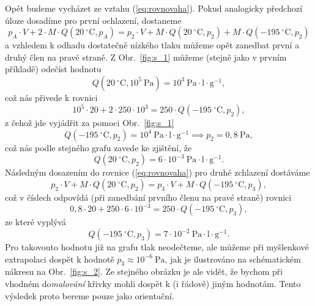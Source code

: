 \documentclass[english]{article}
\newcommand{\unit}[1]{~\mathrm{#1}}
\begin{document}
\vspace{0.5cm}
Opět budeme vycházet ze vztahu (\ref{eq:rovnovaha}). Pokud analogicky předchozí úloze dosadíme pro první ochlazení, dostaneme
\begin{equation}
p_A\cdot V + 2\cdot M\cdot Q(20\unit{^\circ C}, p_A) = p_2\cdot V + M\cdot  Q(20\unit{^\circ C}, p_2) + M\cdot  Q(-195\unit{^\circ C}, p_2)
\label{eq:pr2a}
\end{equation}
a vzhledem k odhadu dostatečně nízkého tlaku můžeme opět zanedbat první a druhý člen na pravé straně. Z Obr.~\ref{fig:s_1} můžeme (stejně jako v prvním příkladě) odečíst hodnotu
\begin{equation}
	Q(20\unit{^\circ C}, 10^{5}\unit{Pa}) = 10^{3}\unit{Pa\cdot l\cdot g^{-1}},
\end{equation}
což nás přivede k rovnici
\begin{equation}
	10^5\cdot 20 + 2\cdot 250\cdot 10^3 = 250\cdot Q(-195\unit{^\circ C}, p_2),
\end{equation}
z čehož jde vyjádřit za pomoci Obr.~\ref{fig:s_1}
\begin{equation}
	Q(-195\unit{^\circ C}, p_2) = 10^4\unit{Pa\cdot l\cdot g^{-1}} \implies p_2 = 0,8\unit{Pa},
\end{equation}
což nás podle stejného grafu zavede ke zjištění, že
\begin{equation}
	 Q(20\unit{^\circ C}, p_2) = 6\cdot 10^{-3}\unit{Pa\cdot l\cdot g^{-1}}.
\end{equation}
Následným dosazením do rovnice (\ref{eq:rovnovaha}) pro druhé zchlazení dostáváme
\begin{equation}
	p_2\cdot V+M\cdot Q(20\unit{^\circ C}, p_2) = p_3\cdot V+M\cdot Q(-195\unit{^\circ C}, p_3),
\end{equation}
což v číslech odpovídá (při zanedbání prvního členu na pravé straně) rovnici
\begin{equation}
	0,8\cdot 20+250\cdot 6\cdot 10^{-3} = 250\cdot Q(-195\unit{^\circ C}, p_3),
\end{equation}
ze které vyplývá
\begin{equation}
	Q(-195\unit{^\circ C}, p_3) = 7\cdot 10^{-2} \unit{Pa\cdot l\cdot g^{-1}}.
\end{equation}
Pro takovouto hodnotu již na grafu tlak neodečteme, ale můžeme při myšlenkové extrapolaci dospět k hodnotě $p_3\approx 10^{-6}\unit{Pa}$, jak je ilustrováno na schématickém nákresu na Obr.~\ref{fig:s_2}. Ze stejného obrázku je ale vidět, že bychom při vhodném do\emph{malování} křivky mohli dospět k (i řádově) jiným hodnotám. Tento výsledek proto bereme pouze jako orientační.
	
\end{document}
